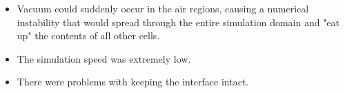 \begin{itemize}
    \item Vacuum could suddenly occur in the air regions, causing a numerical instability that would spread through the entire simulation domain and "eat up" the contents of all other cells.
    
    
    \item The simulation speed was extremely low. %
    
    \item There were problems with keeping the interface intact. %
    

\end{itemize}
